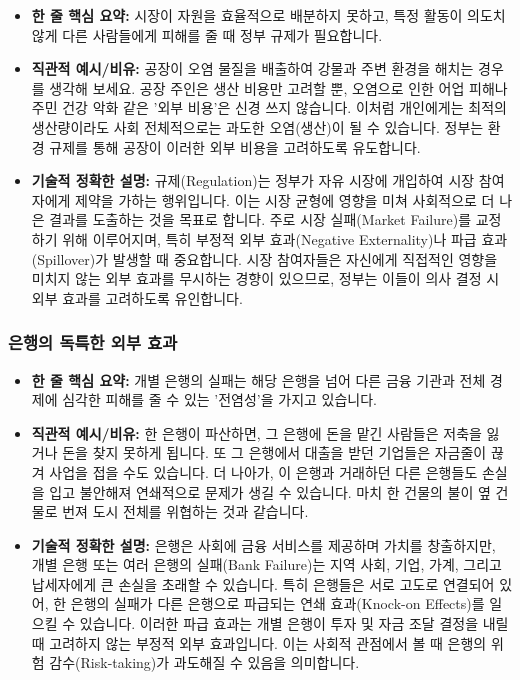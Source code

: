 \documentclass[11pt,a4paper]{article}
\begin{document}
\begin{itemize}
    \item \textbf{한 줄 핵심 요약:} 시장이 자원을 효율적으로 배분하지 못하고, 특정 활동이 의도치 않게 다른 사람들에게 피해를 줄 때 정부 규제가 필요합니다.
    \item \textbf{직관적 예시/비유:} 공장이 오염 물질을 배출하여 강물과 주변 환경을 해치는 경우를 생각해 보세요. 공장 주인은 생산 비용만 고려할 뿐, 오염으로 인한 어업 피해나 주민 건강 악화 같은 '외부 비용'은 신경 쓰지 않습니다. 이처럼 개인에게는 최적의 생산량이라도 사회 전체적으로는 과도한 오염(생산)이 될 수 있습니다. 정부는 환경 규제를 통해 공장이 이러한 외부 비용을 고려하도록 유도합니다.
    \item \textbf{기술적 정확한 설명:} 규제(Regulation)는 정부가 자유 시장에 개입하여 시장 참여자에게 제약을 가하는 행위입니다. 이는 시장 균형에 영향을 미쳐 사회적으로 더 나은 결과를 도출하는 것을 목표로 합니다. 주로 시장 실패(Market Failure)를 교정하기 위해 이루어지며, 특히 부정적 외부 효과(Negative Externality)나 파급 효과(Spillover)가 발생할 때 중요합니다. 시장 참여자들은 자신에게 직접적인 영향을 미치지 않는 외부 효과를 무시하는 경향이 있으므로, 정부는 이들이 의사 결정 시 외부 효과를 고려하도록 유인합니다.
\end{itemize}

\subsubsection{은행의 독특한 외부 효과}

\begin{itemize}
    \item \textbf{한 줄 핵심 요약:} 개별 은행의 실패는 해당 은행을 넘어 다른 금융 기관과 전체 경제에 심각한 피해를 줄 수 있는 '전염성'을 가지고 있습니다.
    \item \textbf{직관적 예시/비유:} 한 은행이 파산하면, 그 은행에 돈을 맡긴 사람들은 저축을 잃거나 돈을 찾지 못하게 됩니다. 또 그 은행에서 대출을 받던 기업들은 자금줄이 끊겨 사업을 접을 수도 있습니다. 더 나아가, 이 은행과 거래하던 다른 은행들도 손실을 입고 불안해져 연쇄적으로 문제가 생길 수 있습니다. 마치 한 건물의 불이 옆 건물로 번져 도시 전체를 위협하는 것과 같습니다.
    \item \textbf{기술적 정확한 설명:} 은행은 사회에 금융 서비스를 제공하며 가치를 창출하지만, 개별 은행 또는 여러 은행의 실패(Bank Failure)는 지역 사회, 기업, 가계, 그리고 납세자에게 큰 손실을 초래할 수 있습니다. 특히 은행들은 서로 고도로 연결되어 있어, 한 은행의 실패가 다른 은행으로 파급되는 연쇄 효과(Knock-on Effects)를 일으킬 수 있습니다. 이러한 파급 효과는 개별 은행이 투자 및 자금 조달 결정을 내릴 때 고려하지 않는 부정적 외부 효과입니다. 이는 사회적 관점에서 볼 때 은행의 위험 감수(Risk-taking)가 과도해질 수 있음을 의미합니다.
\end{itemize}
\end{document}
